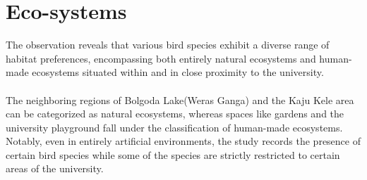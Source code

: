 \section{Eco-systems}
The observation reveals that various bird species exhibit a diverse range of habitat preferences, encompassing both entirely natural ecosystems and human-made ecosystems situated within and in close proximity to the university.
\\\\
The neighboring regions of Bolgoda Lake(Weras Ganga) and the Kaju Kele area can be categorized as natural ecosystems, whereas spaces like gardens and the university playground fall under the classification of human-made ecosystems. Notably, even in entirely artificial environments, the study records the presence of certain bird species while some of the species are strictly restricted to certain areas of the university.


